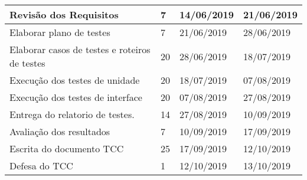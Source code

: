 \begin{table}[H]
\begin{tabular}{|l|l|l|l|}
Revisão dos Requisitos                           & 7                               & 14/06/2019              & 21/06/2019           \\ \hline
Elaborar plano de testes                         & 7                               & 21/06/2019              & 28/06/2019           \\ \hline
Elaborar casos de testes  e roteiros de testes   & 20                              & 28/06/2019              & 18/07/2019           \\ \hline
Execução dos testes de unidade                   & 20                              & 18/07/2019              & 07/08/2019           \\ \hline
Execução dos testes de interface                 & 20                              & 07/08/2019              & 27/08/2019           \\ \hline
Entrega do relatorio de testes.                  & 14                              & 27/08/2019              & 10/09/2019           \\ \hline
Avaliação dos resultados                         & 7                               & 10/09/2019              & 17/09/2019           \\ \hline
Escrita do documento TCC                         & 25                              & 17/09/2019              & 12/10/2019           \\ \hline
Defesa do TCC                                    & 1                               & 12/10/2019              & 13/10/2019           \\ \hline
\end{tabular}
\end{table}